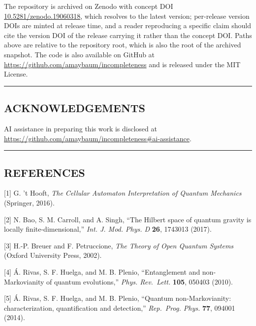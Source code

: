 \documentclass[
]{article}
\begin{document}
The repository is archived on Zenodo with concept DOI
\href{https://doi.org/10.5281/zenodo.19060318}{10.5281/zenodo.19060318},
which resolves to the latest version; per-release version DOIs are
minted at release time, and a reader reproducing a specific claim should
cite the version DOI of the release carrying it rather than the concept
DOI. Paths above are relative to the repository root, which is also the
root of the archived snapshot. The code is also available on GitHub at
\url{https://github.com/amaybaum/incompleteness} and is released under
the MIT License.

\begin{center}\rule{0.5\linewidth}{0.5pt}\end{center}

\hypertarget{acknowledgements}{%
\subsection{ACKNOWLEDGEMENTS}\label{acknowledgements}}

AI assistance in preparing this work is disclosed at\\
\url{https://github.com/amaybaum/incompleteness\#ai-assistance}.

\begin{center}\rule{0.5\linewidth}{0.5pt}\end{center}

\hypertarget{references}{%
\subsection{REFERENCES}\label{references}}

{[}1{]} G. 't Hooft, \emph{The Cellular Automaton Interpretation of
Quantum Mechanics} (Springer, 2016).

{[}2{]} N. Bao, S. M. Carroll, and A. Singh, ``The Hilbert space of
quantum gravity is locally finite-dimensional,'' \emph{Int. J. Mod.
Phys. D} \textbf{26}, 1743013 (2017).

{[}3{]} H.-P. Breuer and F. Petruccione, \emph{The Theory of Open
Quantum Systems} (Oxford University Press, 2002).

{[}4{]} Á. Rivas, S. F. Huelga, and M. B. Plenio, ``Entanglement and
non-Markovianity of quantum evolutions,'' \emph{Phys. Rev.~Lett.}
\textbf{105}, 050403 (2010).

{[}5{]} Á. Rivas, S. F. Huelga, and M. B. Plenio, ``Quantum
non-Markovianity: characterization, quantification and detection,''
\emph{Rep.~Prog. Phys.} \textbf{77}, 094001 (2014).
\end{document}

